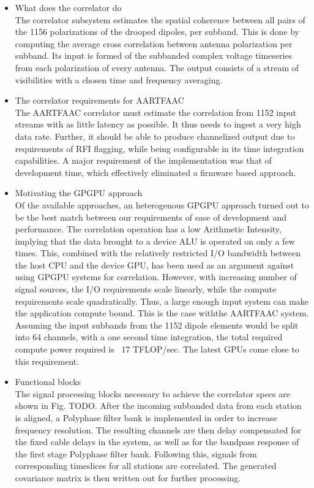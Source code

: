 \documentclass{aa}
\begin{document}
\begin {itemize}
\item What does the correlator do\\
The correlator  subsystem estimates the  spatial coherence between all  pairs of
the 1156  polarizations of the  drooped dipoles, per  subband.  This is  done by
computing  the  average  cross  correlation  between  antenna  polarization  per
subband. Its  input is formed of  the subbanded complex voltage  timeseries from
each  polarization  of every  antenna.   The  output  consists  of a  stream  of
visibilities with a chosen time and  frequency averaging.

\item The correlator  requirements for AARTFAAC \\ 
The AARTFAAC  correlator must estimate  the correlation from 1152  input streams
with as  little latency as possible.  It thus needs  to ingest a very  high data
rate.  Further,  it  should  be  able  to  produce  channelized  output  due  to
requirements of RFI  flagging, while being configurable in  its time integration
capabilities.  A major requirement of the implementation was that of development
time, which effectively eliminated a firmware based approach.

\item Motivating the GPGPU approach\\
Of the available approaches, an heterogenous GPGPU approach turned out to be the
best match between our requirements of  ease of development and performance. The
correlation operation  has a  low Arithmetic Intensity,  implying that  the data
brought to a device ALU is operated on only a few times. This, combined with the
relatively restricted I/O bandwidth between the host CPU and the device GPU, has
been used as  an argument against using GPGPU systems  for correlation. However,
with increasing number  of signal sources, the I/O  requirements scale linearly,
while the compute  requirements scale quadratically. Thus, a  large enough input
system can make the application compute bound. This is the case withthe AARTFAAC
system. Assuming the input subbands from the 1152 dipole elements would be split
into 64 channels, with a one second time integration, the total required compute
power required is ~17 TFLOP/sec. The latest GPUs come close to this requirement.

\item Functional blocks \\
The signal processing blocks necessary to achieve the correlator specs are shown
in Fig. TODO.  After the incoming subbanded data from each station is aligned, a
Polyphase filter bank is implemented  in order to increase frequency resolution.
The resulting channels are then delay  compensated for the fixed cable delays in
the system, as  well as for the  bandpass response of the  first stage Polyphase
filter  bank.  Following  this, signals  from corresponding  timeslices for  all
stations are correlated. The generated covariance matrix is then written out for
further processing.
\end {itemize}
\end{document}
